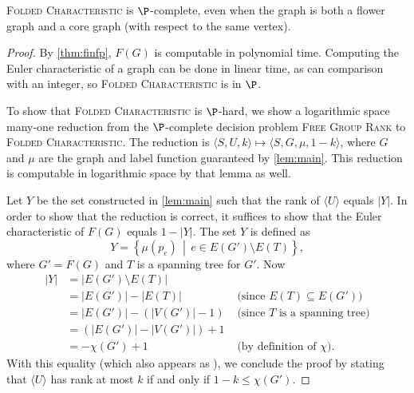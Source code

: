\documentclass{article}
\newcommand{\FGR}{\textsc{Free Group Rank}}
\newcommand{\FC}{\textsc{Folded Characteristic}}
\newcommand{\gen}[1]{\langle #1 \rangle}
\begin{document}
\begin{theorem}\label{thm:fdpcomplete}
  \FC{} is $\P$-complete, even when the graph is both a flower graph and a core graph (with respect to the same vertex).
\end{theorem}
\begin{proof}
  By \autoref{thm:finfp}, $F(G)$ is computable in polynomial time.
  Computing the Euler characteristic of a graph can be done in linear time, as can comparison with an integer, so \FC{} is in $\P$.

  To show that \FC{} is $\P$-hard, we show a logarithmic space many-one reduction from the $\P$-complete decision problem \FGR{} to \FC{}.
  The reduction is $\langle S, U, k \rangle \mapsto \langle S, G, \mu, 1 - k \rangle$, where $G$ and $\mu$ are the graph and label function guaranteed by \autoref{lem:main}.
  This reduction is computable in logarithmic space by that lemma as well.

  Let $Y$ be the set constructed in \autoref{lem:main} such that the rank of $\gen{U}$ equals $|Y|$.
  In order to show that the reduction is correct, it suffices to show that the Euler characteristic of $F(G)$ equals $1 - |Y|$.
  The set $Y$ is defined as
  \begin{equation*}
    Y = \left\{\mu(p_e) \, \middle| \, e \in E(G') \setminus E(T) \right\},
  \end{equation*}
  where $G' = F(G)$ and $T$ is a spanning tree for $G'$.
  Now
  \begin{align*}
    |Y| & = |E(G') \setminus E(T)| & \\
    & = |E(G')| - |E(T)| & \text{ (since } E(T) \subseteq E(G') \text{)} \\
    & = |E(G')| - (|V(G')| - 1) & \text{ (since } T \text{ is a spanning tree)} \\
    & = (|E(G')| - |V(G')|) + 1 & \\
    & = -\chi(G') + 1 & \text{ (by definition of } \chi \text{)}.
  \end{align*}
  With this equality (which also appears as \autocite[Lemma~8.2]{km02}), we conclude the proof by stating that $\gen{U}$ has rank at most $k$ if and only if $1 - k \leq \chi(G')$.
\end{proof}
\end{document}
